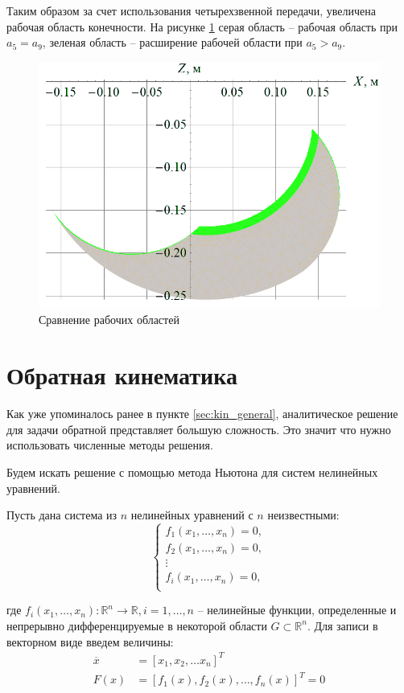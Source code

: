 Таким образом за счет использования четырехзвенной передачи, увеличена рабочая область конечности. На рисунке \ref{fig:fig7} серая область -- рабочая область при $ a_5 = a_9 $, зеленая область -- расширение рабочей области при $ a_5 > a_9 $.
\begin{figure}[h]
    \centering
    \includegraphics[scale=0.8]{chapter_kinematics/figure8.png}
    \caption{Сравнение рабочих областей}
    \label{fig:fig7}
\end{figure}

\section{Обратная кинематика} \label{sec:inverse_kin}
Как уже упоминалось ранее в пункте \ref{sec:kin_general}, аналитическое решение для задачи обратной представляет большую сложность. Это значит что нужно использовать численные методы решения.

Будем искать решение с помощью метода Ньютона для систем нелинейных уравнений.

Пусть дана система из $ n $ нелинейных уравнений с $ n $ неизвестными:
\[
\left\{ 
\begin{array}{c}
    f_1(x_1, \dots, x_n) = 0, \\
    f_2(x_1, \dots, x_n) = 0, \\
    \vdots \\
    f_i(x_1, \dots, x_n) = 0, \\
\end{array} 
\right.
\]

\noindent где $ f_i(x_1,\dots,x_n): \mathbb{R}^n \rightarrow \mathbb{R}, i=1,\dots, n $ -- нелинейные функции, определенные и непрерывно дифференцируемые в некоторой области $ G \subset \mathbb{R}^n $. Для записи в векторном виде введем величины:
\begin{align*}
    \overline{x} &= [x_1, x_2, \dots x_n]^T \\
    F(x) &= [f_1(x), f_2(x),\dots,f_n(x)]^T = 0
\end{align*}

